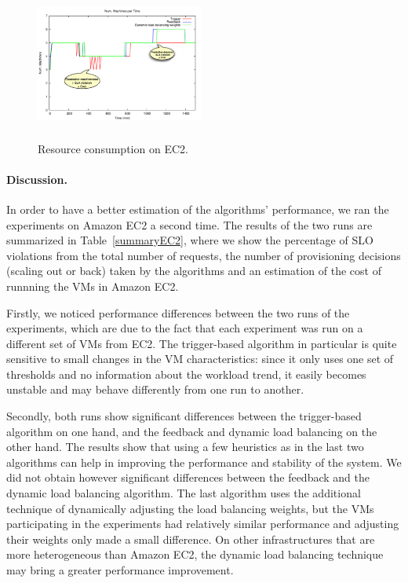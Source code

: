 \begin{figure}[tbp]
\begin{center}
\includegraphics[width=0.49\textwidth, height=5cm]{./images/heterogeneous/explain_EC2_Provisioning}
\end{center}
\vspace{-5mm}
\caption{Resource consumption on EC2.}
\label{resEC2}
\end{figure}


\paragraph{Discussion.}
In order to have a better estimation of the algorithms' performance, we 
ran the experiments on Amazon EC2 a second time. The results of the two 
runs are summarized in Table~\ref{summaryEC2}, where we show the percentage
of SLO violations from the total number of requests, the number of
provisioning decisions (scaling out or back) taken by the algorithms
and an estimation of the cost of runnning the VMs in Amazon EC2.

Firstly, we noticed performance differences between the two runs of the
experiments, which are due to the fact that each experiment was run on
a different set of VMs from EC2. The trigger-based algorithm in particular
is quite sensitive to small changes in the VM characteristics: since it
only uses one set of thresholds and no information about the workload
trend, it easily becomes unstable and may behave differently from one
run to another.

Secondly, both runs show significant differences between the trigger-based
algorithm on one hand, and the feedback and dynamic load balancing on
the other hand. The results show that using a few heuristics as in the last
two algorithms can help in improving the performance and stability
of the system. We did not obtain however significant differences
between the feedback and the dynamic load balancing algorithm. The last
algorithm uses the additional technique of dynamically adjusting the
load balancing weights, but the VMs participating in the experiments 
had relatively similar performance and adjusting their weights only
made a small difference. On other infrastructures that are more heterogeneous
than Amazon EC2, the dynamic load balancing technique may bring
a greater performance improvement.  

